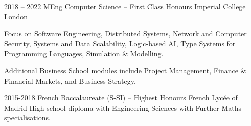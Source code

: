 \begin{entrylist}
    \entry
    {2018 -- 2022}
    {MEng Computer Science -- First Class Honours}
    {Imperial College London}
    {
        Focus on Software Engineering,
        Distributed Systems,
        Network and Computer Security,
        Systems and Data Scalability,
        Logic-based AI,
        Type Systems for Programming Languages,
        Simulation \& Modelling.

        \para
        Additional Business School modules include Project Management, Finance \& Financial Markets, and
        Business Strategy.
    }
    \entry
    {2015-2018}
    {French Baccalaureate (S-SI) -- Highest Honours}
    {French Lycée of Madrid}
    {
        High-school diploma with Engineering Sciences with Further Maths specialisations.
    }
\end{entrylist}
